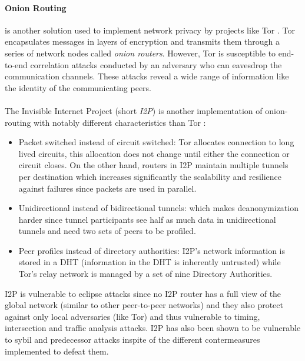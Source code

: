 \paragraph{Onion Routing} is another solution used to implement network
privacy by projects like Tor \cite{tor}. Tor encapsulates messages in layers of
encryption and transmits them through a series of network nodes called
\textit{onion routers}. However, Tor is susceptible to end-to-end correlation attacks conducted by an adversary who can eavesdrop the communication channels. These attacks reveal a wide range of information like the identity of the communicating peers.
\\~\\The Invisible Internet Project (short \textit{I2P}) is another implementation
of onion-routing with notably different characteristics than Tor \cite{i2p} :

\begin{itemize}

    \item Packet switched instead of circuit switched: Tor allocates connection
        to long lived circuits, this allocation does not change until either the
        connection or circuit closes. On the other hand, routers in I2P maintain
        multiple tunnels per destination which increases significantly the
        scalability and resilience against failures since packets are used in
        parallel.

    \item Unidirectional instead of bidirectional tunnels: which makes
        deanonymization harder since tunnel participants see half as much data
        in unidirectional tunnels and need two sets of peers to be profiled.

    \item Peer profiles instead of directory authorities: I2P’s network
        information is stored in a DHT (information in the DHT is inherently
        untrusted) while Tor’s relay network is managed by a set of nine
        Directory Authorities.

\end{itemize}
I2P is vulnerable to eclipse attacks since no I2P router has a full view of the
global network (similar to other peer-to-peer networks) and they also protect
against only local adversaries (like Tor) and thus vulnerable to timing,
intersection and traffic analysis attacks. I2P has also been shown to be vulnerable
to sybil and predecessor attacks inspite of the different contermeasures
implemented to defeat them.

